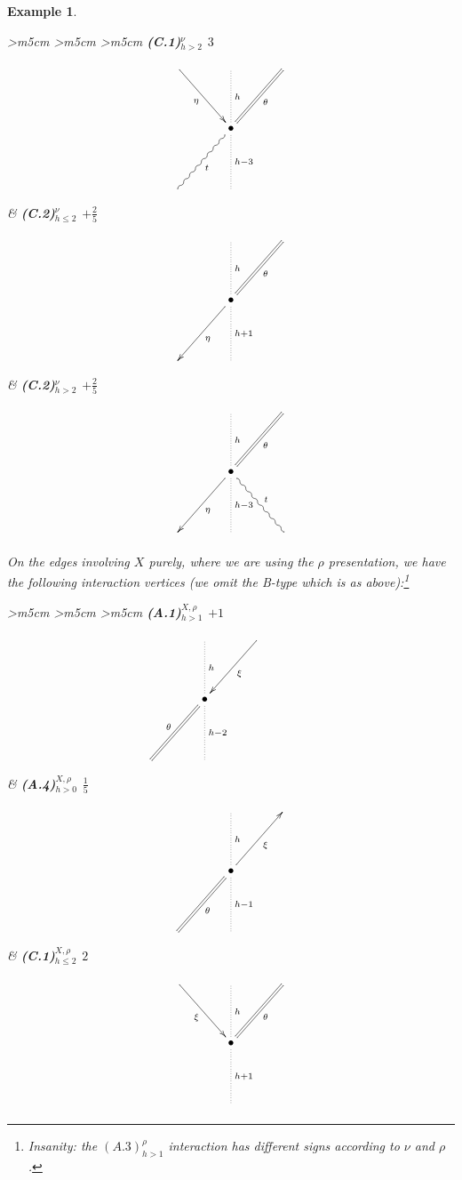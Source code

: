 \documentclass[english,letter paper,12pt,leqno]{article}
\theoremstyle{example}
\newtheorem{example}[theorem]{Example}
\numberwithin{equation}{section}
\begin{document}
\begin{example}
\begin{center}
\begin{tabular}{ >{\centering}m{5cm} >{\centering}m{5cm} >{\centering}m{5cm} }
\textbf{(C.1)${}^\nu_{h>2}$ $3$}
\vspace{0.1cm}
\[
\xymatrix@C+1pc@R+1.5pc{
\ar[dr]_-{\eta} & \ar@{.}[d]^-{h} & \ar@{=}[dl]^-{\theta}\\
& \bullet \ar@{.}[d]^-{h-3} \ar@{~}[dl]^-{t}\\
& &
}
\] %
&
\textbf{(C.2)$^\nu_{h \le 2}$ $+\frac{2}{5}$}
\vspace{0.1cm}
\[
\xymatrix@C+1pc@R+1.5pc{
& \ar@{.}[d]^-{h} & \ar@{=}[dl]^-{\theta} \\
& \bullet \ar[dl]^-{\eta}\ar@{.}[d]^-{h+1} \\
& &
}
\]%
&
\textbf{(C.2)$^\nu_{h > 2}$ $+\frac{2}{5}$}
\vspace{0.1cm}
\[
\xymatrix@C+1pc@R+1.5pc{
& \ar@{.}[d]^-{h} & \ar@{=}[dl]^-{\theta} \\
& \bullet \ar[dl]^-{\eta}\ar@{.}[d]^-{h-3} \ar@{~}[dr]^-{t}\\
& &
}
\] %
\end{tabular}
\end{center}

On the edges involving $X$ purely, where we are using the $\rho$ presentation, we have the following interaction vertices (we omit the B-type which is as above):\footnote{Insanity: the $(A.3)_{h>1}^\rho$ interaction has different signs according to $\nu$ and $\rho$.}

\begin{center}
\begin{tabular}{ >{\centering}m{5cm} >{\centering}m{5cm} >{\centering}m{5cm} }
\textbf{(A.1)${}^{X,\rho}_{h>1}$ $+1$}
\vspace{0.1cm}
\[
\xymatrix@C+1pc@R+1.5pc{
& \ar@{.}[d]^-{h} & \ar[dl]^-{\xi}\\
& \bullet \ar@{=}[dl]_-{\theta} \ar@{.}[d]^-{h-2} \\
& & &
}
\] %
&
\textbf{(A.4)${}^{X,\rho}_{h>0}$ $\frac{1}{5}$}
\vspace{0.1cm}
\[
\xymatrix@C+1pc@R+1.5pc{
& \ar@{.}[d]^-{h} &\\
& \bullet \ar[ur]_-{\xi} \ar@{=}[dl]^-{\theta} \ar@{.}[d]^-{h-1}\\
& &
}
\] %
&
\textbf{(C.1)${}^{X,\rho}_{h \le 2}$ $2$}
\vspace{0.1cm}
\[
\xymatrix@C+1pc@R+1.5pc{
\ar[dr]_-{\xi} & \ar@{.}[d]^-{h} & \ar@{=}[dl]^-{\theta}\\
& \bullet \ar@{.}[d]^-{h+1}\\
& &
}
\]
\end{tabular}
\end{center}


\end{example}
\end{document}
